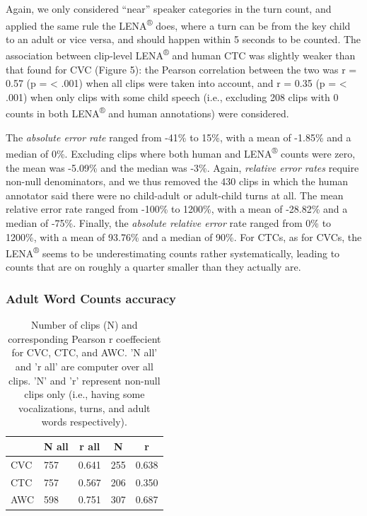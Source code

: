 \documentclass[english,table,man,floatsintext]{apa6}
\begin{document}
Again, we only considered \enquote{near} speaker categories in the turn count, and applied the same rule the LENA\textsuperscript{®} does, where a turn can be from the key child to an adult or vice versa, and should happen within 5 seconds to be counted. The association between clip-level LENA\textsuperscript{®} and human CTC was slightly weaker than that found for CVC (Figure 5): the Pearson correlation between the two was r = 0.57 (p = \textless{} .001) when all clips were taken into account, and r = 0.35 (p = \textless{} .001) when only clips with some child speech (i.e., excluding 208 clips with 0 counts in both LENA\textsuperscript{®} and human annotations) were considered.

The \emph{absolute error rate} ranged from -41\% to 15\%, with a mean of -1.85\% and a median of 0\%. Excluding clips where both human and LENA\textsuperscript{®} counts were zero,
the mean was -5.09\% and the median was -3\%. Again, \emph{relative error rates} require non-null denominators, and we thus removed the 430 clips in which the human annotator said there were no child-adult or adult-child turns at all. The mean relative error rate ranged from -100\% to 1200\%, with a mean of -28.82\% and a median of -75\%. Finally, the \emph{absolute relative error} rate ranged from 0\% to 1200\%, with a mean of 93.76\% and a median of 90\%. For CTCs, as for CVCs, the LENA\textsuperscript{®} seems to be underestimating counts rather systematically, leading to counts that are on roughly a quarter smaller than they actually are.

\hypertarget{adult-word-counts-accuracy}{%
\subsubsection{Adult Word Counts accuracy}\label{adult-word-counts-accuracy}}

\begin{table}[tbp]

\begin{center}
\begin{threeparttable}

\caption{\label{tab:tabrs}Number of clips (N) and corresponding Pearson r coeffecient for CVC, CTC, and AWC. 'N all' and 'r all' are computer over all clips. 'N' and 'r' represent non-null clips only (i.e., having some vocalizations, turns, and adult words respectively).}

\begin{tabular}{lllll}
\toprule
 & \multicolumn{1}{c}{N all} & \multicolumn{1}{c}{r all} & \multicolumn{1}{c}{N} & \multicolumn{1}{c}{r}\\
\midrule
CVC & 757 & 0.641 & 255 & 0.638\\
CTC & 757 & 0.567 & 206 & 0.350\\
AWC & 598 & 0.751 & 307 & 0.687\\
\bottomrule
\end{tabular}

\end{threeparttable}
\end{center}

\end{table}
\end{document}
